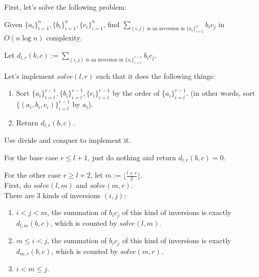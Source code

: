 \begin{pr}

\newcommand{\seq}[3]{\{{#1}_i\}_{i=#2}^{#3}}

First, let's solve the following problem:

Given $\seq a1n, \seq b1n, \seq c1n$, find $\sum_{(i, j)\text{ is an inversion in }\seq a1n}b_ic_j$ in $O(n\log n)$ complexity.

Let $d_{l, r}(b, c):=\sum_{(i, j)\text{ is an inversion in }\seq al{r-1}}b_ic_j$.

Let's implement $solve(l, r)$ such that it does the following things:
\begin{enumerate}
\item Sort $\seq al{r-1}, \seq bl{r-1}, \seq cl{r-1}$ by the order of $\seq al{r-1}$. (in other words, sort $\{(a_i, b_i, c_i)\}_{i=l}^{r-1}$ by $a_i$).
\item Return $d_{l, r}(b, c)$.
\end{enumerate}

Use divide and conquer to implement it.

For the base case $r\leq l+1$, just do nothing and return $d_{l, r}(b, c)=0$.

For the other case $r\geq l+2$, let $m:=\lfloor\frac{l+r}2\rfloor$.\\
First, do $solve(l, m)$ and $solve(m, r)$.\\
There are $3$ kinds of inversions $(i, j)$:
\begin{enumerate}[K-(1)]
\item $i<j<m$, the summation of $b_ic_j$ of this kind of inversions is exactly $d_{l, m}(b, c)$, which is counted by $solve(l, m)$.
\item $m\leq i<j$, the summation of $b_ic_j$ of this kind of inversions is exactly $d_{m, r}(b, c)$, which is counted by $solve(m, r)$.
\item $i<m\leq j$.
\end{enumerate}


\end{pr}
